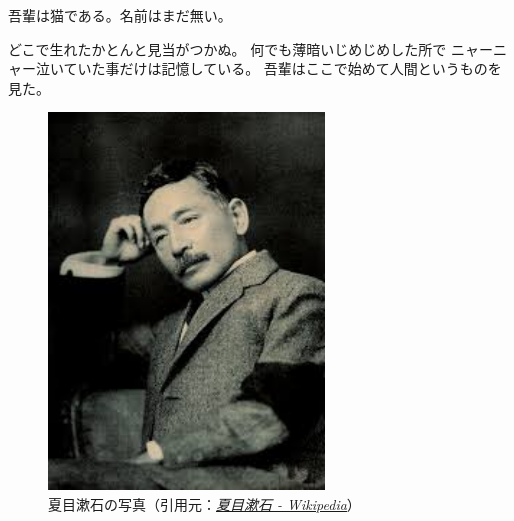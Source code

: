 \documentclass[uplatex]{jsarticle}
\newcommand{\linedhref}[2]{\underline{\href{#1}{\emph{#2}}}}
\begin{document}
吾輩は猫である。名前はまだ無い\cite{Soseki1905}。

どこで生れたかとんと見当がつかぬ。
何でも薄暗いじめじめした所で
ニャーニャー泣いていた事だけは記憶している。
吾輩はここで始めて人間というものを見た。

\begin{figure}[H]
	\begin{center}
		\includegraphics[height=10cm]{img/natsume_soseki.jpeg}
		\caption{夏目漱石の写真（引用元：\linedhref{https://ja.wikipedia.org/wiki/\%E5\%A4\%8F\%E7\%9B\%AE\%E6\%BC\%B1\%E7\%9F\%B3}{夏目漱石 - Wikipedia}）}
	\end{center}
\end{figure}



\end{document}
